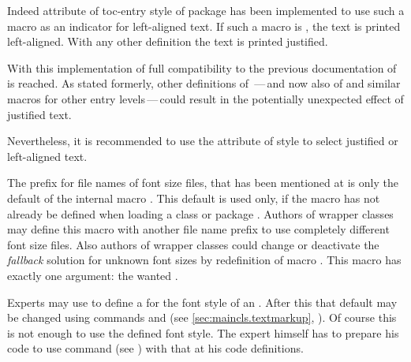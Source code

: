 Indeed attribute  of toc-entry style 
of package  has been implemented to
use such a macro  as an indicator for
left-aligned text. If such a macro is , the text is printed
left-aligned. With any other definition the text is printed justified.

With this implementation of  full compatibility to the
previous documentation of  is reached. As
stated formerly, other definitions of \,---\,and now
also of  and similar macros for other entry
levels\,---\,could result in the potentially unexpected effect of justified
text.

Nevertheless, it is recommended to use the attribute of style 
to select justified or left-aligned text.%
\EndIndexGroup



\begin{Declaration}
\end{Declaration}
The prefix  for file names of font size files, that has been
mentioned at
 is only the default of the
internal macro . This
default is used only, if the macro has not already be defined when loading a
\KOMAScript{} class or package . Authors of wrapper classes
may define this macro with another file name prefix to use completely
different font size files. Also authors of wrapper classes
could change or deactivate the \emph{fallback} solution for unknown font sizes
by redefinition of macro
. This macro has
exactly one argument: the wanted .%
%
\EndIndexGroup


\begin{Declaration}
\end{Declaration}
Experts may use  to define a  for the font
style of an . After this that default may be changed using
commands  and
 (see \autoref{sec:maincls.textmarkup},
). Of course this is not enough to use
the defined font style. The expert himself has to prepare his code to use
command %
 (see
) with that  at his code
definitions.

